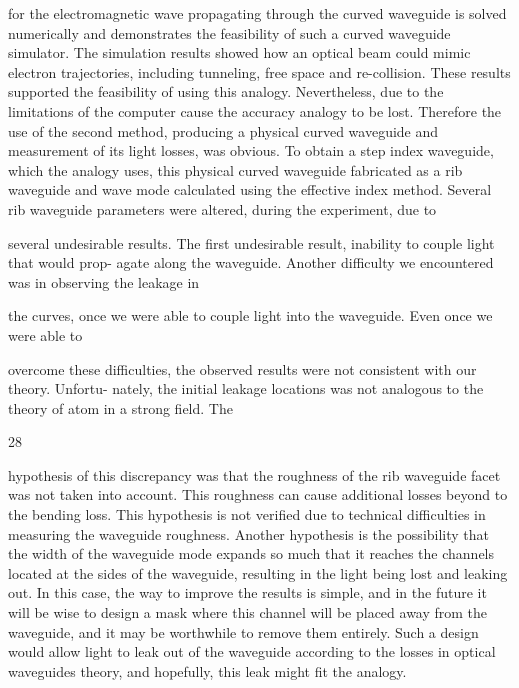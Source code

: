 \documentclass[\main/master.tex]{subfiles}
\begin{document}
for the electromagnetic wave propagating through the curved waveguide is solved numerically
and demonstrates the feasibility of such a curved waveguide simulator. The simulation results
showed how an optical beam could mimic electron trajectories, including tunneling, free space
and re-collision. These results supported the feasibility of using this analogy. Nevertheless,
due to the limitations of the computer cause the accuracy analogy to be lost. Therefore the use
of the second method, producing a physical curved waveguide and measurement of its light
losses, was obvious. To obtain a step index waveguide, which the analogy uses, this physical
curved waveguide fabricated as a rib waveguide and wave mode calculated using the effective
index method. Several rib waveguide parameters were altered, during the experiment, due to

several undesirable results. The first undesirable result, inability to couple light that would prop-
agate along the waveguide. Another difficulty we encountered was in observing the leakage in

the curves, once we were able to couple light into the waveguide. Even once we were able to

overcome these difficulties, the observed results were not consistent with our theory. Unfortu-
nately, the initial leakage locations was not analogous to the theory of atom in a strong field. The

28

hypothesis of this discrepancy was that the roughness of the rib waveguide facet was not taken
into account. This roughness can cause additional losses beyond to the bending loss. This
hypothesis is not verified due to technical difficulties in measuring the waveguide roughness.
Another hypothesis is the possibility that the width of the waveguide mode expands so much
that it reaches the channels located at the sides of the waveguide, resulting in the light being
lost and leaking out. In this case, the way to improve the results is simple, and in the future it
will be wise to design a mask where this channel will be placed away from the waveguide, and
it may be worthwhile to remove them entirely. Such a design would allow light to leak out of the
waveguide according to the losses in optical waveguides theory, and hopefully, this leak might
fit the analogy.
\end{document}
